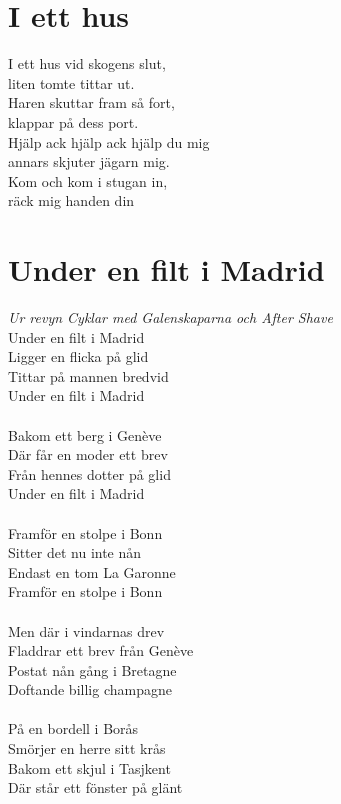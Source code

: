 \section{I ett hus}
I ett hus vid skogens slut,\\
liten tomte tittar ut.\\
Haren skuttar fram så fort,\\
klappar på dess port.\\
Hjälp ack hjälp ack hjälp du mig\\
annars skjuter jägarn mig.\\
Kom och kom i stugan in,\\
räck mig handen din\\

\section{Under en filt i Madrid}
\textit{Ur revyn Cyklar med Galenskaparna och After Shave}
\vspace{2mm}\\
Under en filt i Madrid\\
Ligger en flicka på glid\\
Tittar på mannen bredvid\\
Under en filt i Madrid\\
\\
Bakom ett berg i Genève\\
Där får en moder ett brev\\
Från hennes dotter på glid\\
Under en filt i Madrid\\
\\
Framför en stolpe i Bonn\\
Sitter det nu inte nån\\
Endast en tom La Garonne\\
Framför en stolpe i Bonn\\
\\
Men där i vindarnas drev\\
Fladdrar ett brev från Genève\\
Postat nån gång i Bretagne\\
Doftande billig champagne\\
\\
På en bordell i Borås\\
Smörjer en herre sitt krås\\
Bakom ett skjul i Tasjkent\\
Där står ett fönster på glänt\\

